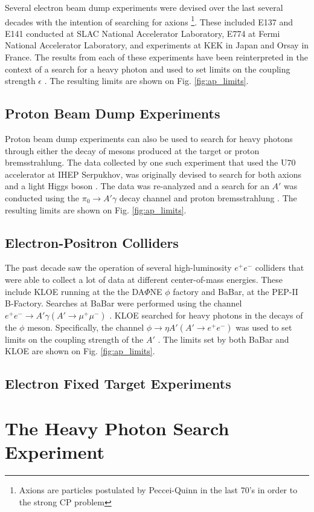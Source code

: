 
Several electron beam dump experiments were devised over the last several decades with
the intention of searching for axions \footnote{Axions are particles postulated 
by Peccei-Quinn in the last 70's in order to the strong CP problem}.  These 
included E137 \cite{Bjorken:1988as}
and E141 \cite{riordan1987} conducted at SLAC National Accelerator Laboratory,
E774 \cite{bross1991} at Fermi National Accelerator Laboratory, and experiments at 
KEK \cite{konaka1986} in Japan and Orsay \cite{davier1989} in France. 
The results from each of these experiments have been reinterpreted in the 
context of a search for a heavy photon and used to set limits on the coupling
strength $\epsilon$ \cite{Bjorken:2009mm, andreas2012}.  The resulting limits are 
shown on Fig. \ref{fig:ap_limits}.

\subsection{Proton Beam Dump Experiments}

Proton beam dump experiments can also be used to search for heavy photons
through either the decay of mesons produced at the target or proton
bremsstrahlung.  The data collected by one such experiment that used the U70
accelerator at IHEP Serpukhov, was originally devised to search for both axions
and a light Higgs boson \cite{Blumlein:1990ay, Blumlein:1991xh}.  The data was 
re-analyzed and a search for an $A'$ was conducted
using the $\pi_0 \rightarrow A'\gamma$ decay channel and proton bremsstrahlung
\cite{johannes2011, johannes2014}. The resulting limits are shown on Fig. 
\ref{fig:ap_limits}.

\subsection{Electron-Positron Colliders}

The past decade saw the operation of several high-luminosity $e^+e^-$ colliders 
that were able to collect a lot of data at different center-of-mass energies.
These include KLOE running at the the DA$\Phi$NE $\phi$ factory and BaBar, 
at the PEP-II B-Factory. Searches at BaBar were performed using the channel 
$e^+e^- \rightarrow A' \gamma (A' \rightarrow \mu^+\mu^-)$ 
\cite{Reece:2009un, Aubert:2009cp}.  KLOE 
searched for heavy photons in the decays of the $\phi$ meson.  Specifically, 
the channel $\phi \rightarrow \eta A' (A' \rightarrow e^+e^-)$ was used to
set limits on the coupling strength of the $A'$ 
\cite{Babusci:2012cr, Archilli:2011zc}.
The limits set by both BaBar and KLOE are shown on Fig. \ref{fig:ap_limits}.

\subsection{Electron Fixed Target Experiments}

\section{The Heavy Photon Search Experiment}

